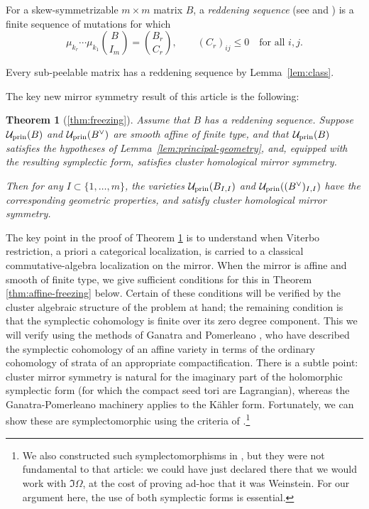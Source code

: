 \documentclass[12pt, letter]{amsart}
\newtheorem{theorem}{Theorem}[section]
\theoremstyle{definition}
\newcommand{\pr}{\mathrm{prin}}
\numberwithin{equation}{section}
\begin{document}
For a skew-symmetrizable $m\times m$ matrix $B$, a
\emph{reddening sequence} (see \cite[Section~3]{Keller-DT} and
\cite[Definition~1.0.4]{BHIT})
is a finite sequence of mutations for which
\[
 \mu_{k_r}\cdots\mu_{k_1}\binom{B}{I_m}
 =\binom{B_r}{C_r},\qquad (C_r)_{ij}\le0\quad\text{for all }i,j.
\]

Every sub-peelable matrix has a reddening sequence by Lemma~\ref{lem:class}.


The key new mirror symmetry result of this article is the following: 

\begin{theorem}[\ref{thm:freezing}] \label{thm: intro freezing}
Assume that $B$ has a reddening sequence.
Suppose 
$\cU_{\pr}(B)$ and $\cU_{\pr}(B^\vee)$ are smooth affine of finite type, and that $\cU_{\pr}(B)$ satisfies the hypotheses of 
Lemma~\ref{lem:principal-geometry}, and, equipped with the resulting symplectic form, satisfies cluster homological mirror symmetry.

Then for any $I\subset \{1,\ldots,m\}$, the varieties
$\cU_{\pr}(B_{I,I})$ and $\cU_{\pr}((B^\vee)_{I,I})$ have the corresponding geometric properties, and satisfy
cluster homological mirror symmetry.
\end{theorem}

The key point in the proof of Theorem \ref{thm: intro freezing} is to understand when Viterbo restriction, a priori a categorical localization, is carried to a classical commutative-algebra localization on the mirror.  When the mirror is affine and smooth of finite type, we give sufficient conditions for this in Theorem \ref{thm:affine-freezing} below.  Certain of these conditions will be verified by the  cluster algebraic structure of the problem at hand; the remaining condition is that the symplectic cohomology is finite over its zero degree component.  This we will verify using the methods of Ganatra and Pomerleano \cite{GP, Pom}, who have described the symplectic cohomology of an affine variety in terms of the ordinary cohomology of strata of an appropriate compactification.  There is a subtle point: cluster mirror symmetry is natural for the imaginary part of the holomorphic symplectic form (for which the compact seed tori are Lagrangian), whereas the Ganatra-Pomerleano machinery applies to the K\"ahler form.  Fortunately, we can show these are symplectomorphic using the criteria of \cite{HSinv}.\footnote{We also constructed such symplectomorphisms in \cite{HS}, but they were not fundamental to that article: we could have just declared there that we would work with $\Im \Omega$, at the cost of proving ad-hoc that it was Weinstein.  For our argument here, the use of both symplectic forms is essential.}
\end{document}
